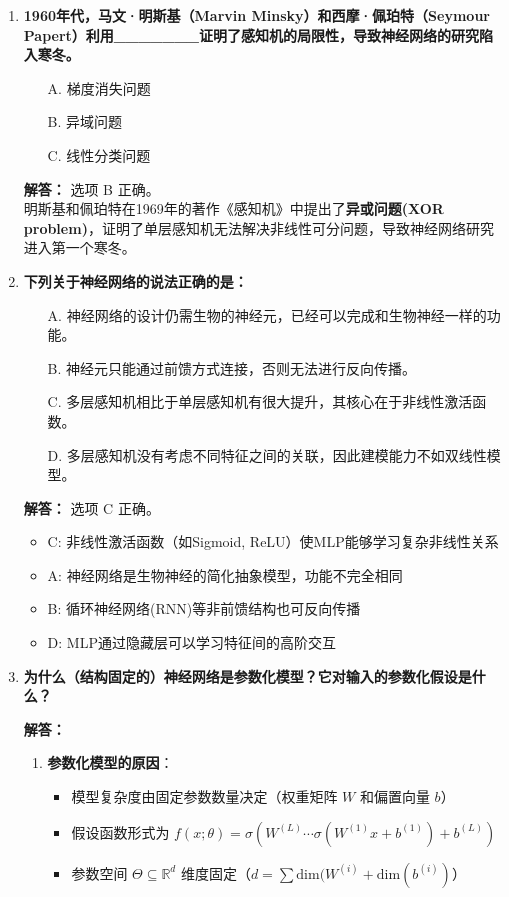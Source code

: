 \documentclass[a4paper,12pt]{book}
\begin{document}
\begin{enumerate}[label=\arabic*.]
    \item \textbf{1960年代，马文·明斯基（Marvin Minsky）和西摩·佩珀特（Seymour Papert）利用\_\_\_\_\_\_\_证明了感知机的局限性，导致神经网络的研究陷入寒冬。}
    \begin{itemize}
        \item[A.] 梯度消失问题 
        \item[B.] 异域问题 
        \item[C.] 线性分类问题
    \end{itemize}
    
    \textbf{解答：} 选项 B 正确。\\
    明斯基和佩珀特在1969年的著作《感知机》中提出了\textbf{异或问题(XOR problem)}，证明了单层感知机无法解决非线性可分问题，导致神经网络研究进入第一个寒冬。
    
    \item \textbf{下列关于神经网络的说法正确的是：}
    \begin{itemize}
        \item[A.] 神经网络的设计仍需生物的神经元，已经可以完成和生物神经一样的功能。
        \item[B.] 神经元只能通过前馈方式连接，否则无法进行反向传播。
        \item[C.] 多层感知机相比于单层感知机有很大提升，其核心在于非线性激活函数。
        \item[D.] 多层感知机没有考虑不同特征之间的关联，因此建模能力不如双线性模型。
    \end{itemize}
    
    \textbf{解答：} 选项 C 正确。\\
    \begin{itemize}
        \item C: 非线性激活函数（如Sigmoid, ReLU）使MLP能够学习复杂非线性关系
        \item A: 神经网络是生物神经的简化抽象模型，功能不完全相同
        \item B: 循环神经网络(RNN)等非前馈结构也可反向传播
        \item D: MLP通过隐藏层可以学习特征间的高阶交互
    \end{itemize}
    
    \item \textbf{为什么（结构固定的）神经网络是参数化模型？它对输入的参数化假设是什么？}
    
    \textbf{解答：}
    \begin{enumerate}
        \item \textbf{参数化模型的原因}：
        \begin{itemize}
            \item 模型复杂度由固定参数数量决定（权重矩阵 $W$ 和偏置向量 $b$）
            \item 假设函数形式为 $f(x; \theta) = \sigma(W^{(L)} \cdots \sigma(W^{(1)}x + b^{(1)}) + b^{(L)})$
            \item 参数空间 $\Theta \subseteq \mathbb{R}^d$ 维度固定（$d = \sum \text{dim}(W^{(i)} + \text{dim}(b^{(i)})$）
        \end{itemize}
        

\end{enumerate}
\end{enumerate}
\end{document}
